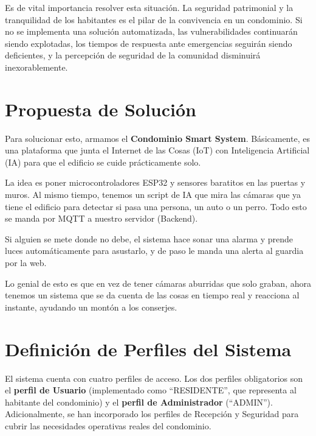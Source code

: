 \documentclass[12pt,a4paper]{article}
\begin{document}
Es de vital importancia resolver esta situación. La seguridad patrimonial y la tranquilidad de los habitantes es el pilar de la convivencia en un condominio. Si no se implementa una solución automatizada, las vulnerabilidades continuarán siendo explotadas, los tiempos de respuesta ante emergencias seguirán siendo deficientes, y la percepción de seguridad de la comunidad disminuirá inexorablemente.

\section{Propuesta de Solución}
Para solucionar esto, armamos el \textbf{Condominio Smart System}. Básicamente, es una plataforma que junta el Internet de las Cosas (IoT) con Inteligencia Artificial (IA) para que el edificio se cuide prácticamente solo.

La idea es poner microcontroladores ESP32 y sensores baratitos en las puertas y muros. Al mismo tiempo, tenemos un script de IA que mira las cámaras que ya tiene el edificio para detectar si pasa una persona, un auto o un perro. Todo esto se manda por MQTT a nuestro servidor (Backend).

Si alguien se mete donde no debe, el sistema hace sonar una alarma y prende luces automáticamente para asustarlo, y de paso le manda una alerta al guardia por la web.

Lo genial de esto es que en vez de tener cámaras aburridas que solo graban, ahora tenemos un sistema que se da cuenta de las cosas en tiempo real y reacciona al instante, ayudando un montón a los conserjes.

\section{Definición de Perfiles del Sistema}
El sistema cuenta con cuatro perfiles de acceso. Los dos perfiles obligatorios son el \textbf{perfil de Usuario} (implementado como ``RESIDENTE'', que representa al habitante del condominio) y el \textbf{perfil de Administrador} (``ADMIN''). Adicionalmente, se han incorporado los perfiles de Recepción y Seguridad para cubrir las necesidades operativas reales del condominio.
\end{document}
